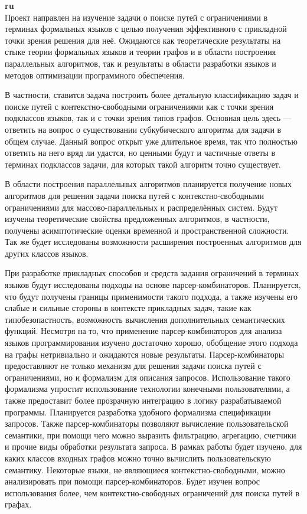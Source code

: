 \documentclass[12pt]{article}  %
\theoremstyle{remark}
\begin{document}
\textbf{ru}\\
%
Проект направлен на изучение задачи о поиске путей с ограничениями в терминах формальных языков с целью получения эффективного с прикладной точки зрения решения для неё.
Ожидаются как теоретические результаты на стыке теории формальных языков и теории графов и в области построения параллельных алгоритмов, так и результаты в области разработки языков и методов оптимизации программного обеспечения.

В частности, ставится задача построить более детальную классификацию задач и поиске путей с контекстно-свободными ограничениями как с точки зрения подклассов языков, так и с точки зрения типов графов.
Основная цель здесь --- ответить на вопрос о существовании субкубического алгоритма для задачи в общем случае.
Данный вопрос открыт уже длительное время, так что полностью ответить на него вряд ли удастся, но ценными будут и частичные ответы в терминах подклассов задачи, для которых такой алгоритм точно существует.

В области построения параллельных алгоритмов планируется получение новых алгоритмов для решения задачи поиска путей с контекстно-свободными ограничениями для массово-параллельных и распределённых систем.
Будут изучены теоретические свойства предложенных алгоритмов, в частности, получены асимптотические оценки временной и пространственной сложности.
Так же будет исследованы возможности расширения построенных алгоритмов для других классов языков.

При разработке прикладных способов и средств задания ограничений в терминах языков будут исследованы подходы на основе парсер-комбинаторов.
Планируется, что будут получены границы применимости такого подхода, а также изучены его слабые и сильные стороны в контексте прикладных задач, такие как типобезопастность, возможность вычисления дополнительных семантических функций.
Несмотря на то, что применение парсер-комбинаторов для анализа языков программирования изучено достаточно хорошо, обобщение этого подхода на графы нетривиально и ожидаются новые результаты.
Парсер-комбинаторы предоставляют не только механизм для решения задачи поиска путей с ограничениями, но и формализм для описания запросов.
Использование такого формализма упростит использование технологии конечными пользователями, а также предоставит более прозрачную интеграцию в логику разрабатываемой программы.
Планируется разработка удобного формализма спецификации запросов.
Также парсер-комбинаторы позволяют вычисление пользовательской семантики, при помощи чего можно выразить фильтрацию, агрегацию, счетчики и прочие виды обработки результата запроса.
В рамках работы будет изучено, для каких классов входных графов можно точно вычислить пользовательскую семантику.
Некоторые языки, не являющиеся контекстно-свободными, можно анализировать при помощи парсер-комбинаторов.
Будет изучен вопрос использования более, чем контекстно-свободных ограничений для поиска путей в графах.
\end{document}
